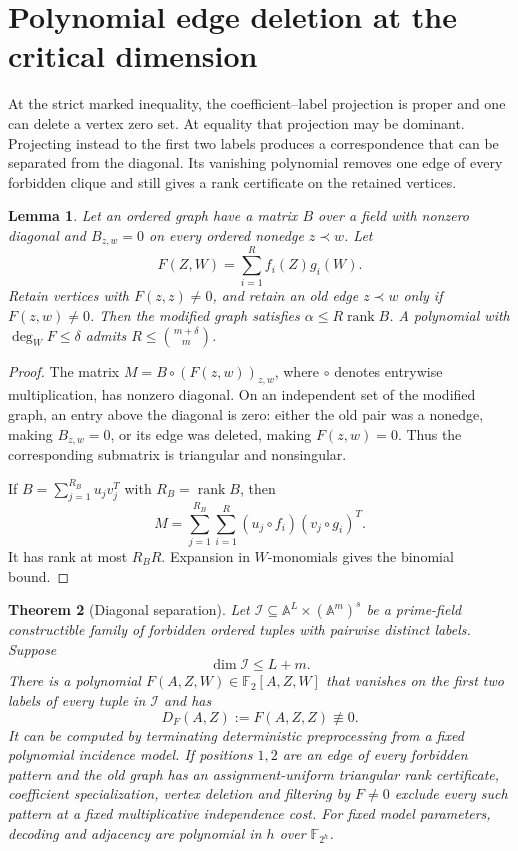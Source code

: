 \documentclass[11pt,a4paper]{article}
\newcommand{\F}{\mathbb F}
\newcommand{\A}{\mathbb A}
\newcommand{\Ical}{\mathcal I}
\DeclareMathOperator{\rank}{rank}
\newtheorem{theorem}{Theorem}[section]
\newtheorem{lemma}[theorem]{Lemma}
\theoremstyle{definition}
\theoremstyle{remark}
\numberwithin{equation}{section}
\begin{document}
\section{Polynomial edge deletion at the critical dimension}\label{sec:filter}
At the strict marked inequality, the coefficient--label projection is proper and one can delete a vertex zero set. At equality that projection may be dominant. Projecting instead to the first two labels produces a correspondence that can be separated from the diagonal. Its vanishing polynomial removes one edge of every forbidden clique and still gives a rank certificate on the retained vertices.

\begin{lemma}\label{lem:filter-rank}
Let an ordered graph have a matrix $B$ over a field with nonzero diagonal and $B_{z,w}=0$ on every ordered nonedge $z\prec w$. Let
\[
F(Z,W)=\sum_{i=1}^R f_i(Z)g_i(W).
\]
Retain vertices with $F(z,z)\ne0$, and retain an old edge $z\prec w$ only if $F(z,w)\ne0$. Then the modified graph satisfies $\alpha\le R\rank B$. A polynomial with $\deg_WF\le\delta$ admits $R\le\binom{m+\delta}{m}$.
\end{lemma}

\begin{proof}
The matrix $M=B\circ(F(z,w))_{z,w}$, where $\circ$ denotes entrywise multiplication, has nonzero diagonal. On an independent set of the modified graph, an entry above the diagonal is zero: either the old pair was a nonedge, making $B_{z,w}=0$, or its edge was deleted, making $F(z,w)=0$. Thus the corresponding submatrix is triangular and nonsingular.

If $B=\sum_{j=1}^{R_B}u_jv_j^T$ with $R_B=\rank B$, then
\[
M=\sum_{j=1}^{R_B}\sum_{i=1}^R(u_j\circ f_i)(v_j\circ g_i)^T.
\]
It has rank at most $R_BR$. Expansion in $W$-monomials gives the binomial bound.
\end{proof}

\begin{theorem}[Diagonal separation]\label{thm:diagonal-separation}
Let $\Ical\subseteq\A^L\times(\A^m)^s$ be a prime-field constructible family of forbidden ordered tuples with pairwise distinct labels. Suppose
\begin{equation}\label{eq:critical-dimension}
\dim\Ical\le L+m.
\end{equation}
There is a polynomial $F(A,Z,W)\in\F_2[A,Z,W]$ that vanishes on the first two labels of every tuple in $\Ical$ and has
\begin{equation}\label{eq:nonzero-diagonal}
D_F(A,Z):=F(A,Z,Z)\not\equiv0.
\end{equation}
It can be computed by terminating deterministic preprocessing from a fixed polynomial incidence model. If positions $1,2$ are an edge of every forbidden pattern and the old graph has an assignment-uniform triangular rank certificate, coefficient specialization, vertex deletion and filtering by $F\ne0$ exclude every such pattern at a fixed multiplicative independence cost. For fixed model parameters, decoding and adjacency are polynomial in $h$ over $\F_{2^h}$.
\end{theorem}
\end{document}
